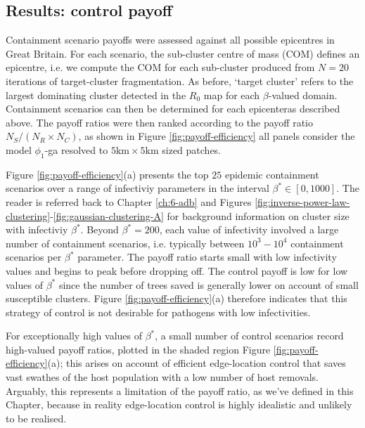 \subsection{Results: control payoff}

Containment scenario payoffs were assessed against all possible epicentres in Great Britain.
For each scenario, the sub-cluster centre of mass (COM) defines an epicentre, i.e. we compute the COM for each sub-cluster produced from $N=20$ iterations of target-cluster fragmentation. 
As before, `target cluster' refers to the largest dominating cluster detected in the $R_0$ map for each $\beta$-valued domain.
Containment scenarios can then be determined for each epicenter\textemdash as described above.
The payoff ratios were then ranked according to the payoff ratio $N_S/ (N_R\times N_C)$, as shown in Figure \ref{fig:payoff-efficiency}\textemdash 
all panels consider the model $\phi_1$-ga resolved to $\mathrm{5 km \times 5 km}$ sized patches.

Figure \ref{fig:payoff-efficiency}(a) presents the top $25$ epidemic containment scenarios over a range of infectiviy parameters in the interval $\beta^* \in [0, 1000]$. 
The reader is referred back to Chapter \ref{ch:6-adb} and Figures \ref{fig:inverse-power-law-clustering}-\ref{fig:gaussian-clustering-A} for background information on cluster size with infectiviy $\beta^*$.
Beyond $\beta^*=200$, each value of infectivity involved a large number of containment scenarios, i.e. typically between $10^3-10^4$ containment scenarios per $\beta^*$ parameter.
The payoff ratio starts small with low infectivity values and begins to peak before dropping off. 
The control payoff is low for low values of $\beta^*$ since the number of trees saved is generally lower on account of small susceptible clusters.
Figure \ref{fig:payoff-efficiency}(a) therefore indicates that this strategy of control is not desirable for pathogens with low infectivities.

For exceptionally high values of $\beta^*$, a small number of control scenarios record high-valued payoff ratios, plotted in the shaded region Figure \ref{fig:payoff-efficiency}(a);
this arises on account of efficient edge-location control that saves vast swathes of the host population with a low number of host removals.
Arguably, this represents a limitation of the payoff ratio, as we've defined in this Chapter, because in reality edge-location control is highly idealistic and unlikely to be realised.

